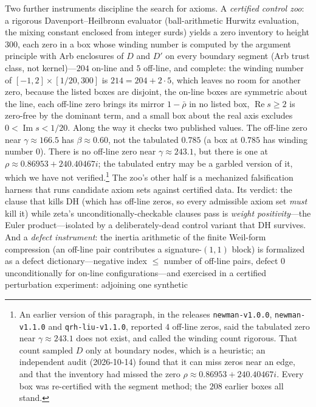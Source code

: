 Two further instruments discipline the search for axioms. A \emph{certified
control zoo}: a rigorous Davenport--Heilbronn evaluator (ball-arithmetic
Hurwitz evaluation, the mixing constant enclosed from integer surds) yields a
zero inventory to height $300$, each zero in a box whose winding number is
computed by the argument principle with Arb enclosures of $D$ and $D'$ on
every boundary segment (Arb trust class, not kernel)---$204$ on-line and $5$
off-line, and complete: the winding number of $[-1,2]\times[1/20,300]$ is
$214 = 204 + 2\cdot 5$, which leaves no room for another zero, because the
listed boxes are disjoint, the on-line boxes are symmetric about the line,
each off-line zero brings its mirror $1-\bar\rho$ in no listed box,
$\operatorname{Re} s \ge 2$ is zero-free by the dominant term, and a small
box about the real axis excludes $0 < \operatorname{Im} s < 1/20$. Along the way it checks two published values. The
off-line zero near $\gamma \approx 166.5$ has $\beta \approx 0.60$, not the
tabulated $0.785$ (a box at $0.785$ has winding number $0$). There is no
off-line zero near $\gamma \approx 243.1$, but there is one at
$\rho \approx 0.86953 + 240.40467i$; the tabulated entry may be a garbled
version of it, which we have not verified.\footnote{An earlier version of this
paragraph, in the releases \texttt{newman-v1.0.0}, \texttt{newman-v1.1.0} and
\texttt{qrh-liu-v1.1.0}, reported $4$ off-line zeros, said the tabulated zero
near $\gamma \approx 243.1$ does not exist, and called the winding count
rigorous. That count sampled $D$ only at boundary nodes, which is a
heuristic; an independent audit (2026-10-14) found that it can miss zeros
near an edge, and that the inventory had missed the zero $\rho \approx 0.86953 + 240.40467i$.
Every box was re-certified with the segment method; the $208$ earlier boxes
all stand.} The zoo's other half is a mechanized falsification
harness that runs candidate axiom sets against certified data. Its verdict:
the clause that kills DH (which has off-line zeros, so every admissible axiom
set \emph{must} kill it) while zeta's unconditionally-checkable clauses pass
is \emph{weight positivity}---the Euler product---isolated by a
deliberately-dead control variant that DH survives. And a \emph{defect
instrument}: the inertia arithmetic of the finite Weil-form compression
\cite{alpogefurman} (an off-line pair contributes a signature-$(1,1)$ block)
is formalized as a defect dictionary---negative index $\le$ number of
off-line pairs, defect $0$ unconditionally for on-line configurations---and
exercised in a certified perturbation experiment: adjoining one synthetic
